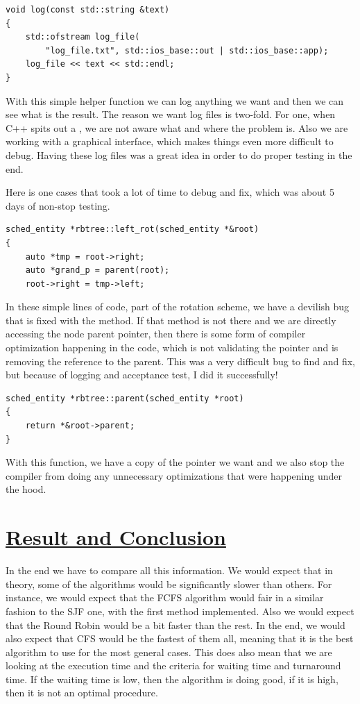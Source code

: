 \documentclass{article}
\newcommand{\code}[1]{\codeinline{\texttt{#1}}}
\begin{document}
\begin{lstlisting}
void log(const std::string &text)
{
    std::ofstream log_file(
        "log_file.txt", std::ios_base::out | std::ios_base::app);
    log_file << text << std::endl;
}
\end{lstlisting}

With this simple helper function we can log anything we want and then we can see what is the result. The reason we want log files is two-fold. For one, when C++ spits out a \code{segfault}, we are not aware what and where the problem is. Also we are working with a graphical interface, which makes things even more difficult to debug. Having these log files was a great idea in order to do proper testing in the end.

Here is one cases that took a lot of time to debug and fix, which was about 5 days of non-stop testing.

\begin{lstlisting}
sched_entity *rbtree::left_rot(sched_entity *&root)
{
    auto *tmp = root->right;
    auto *grand_p = parent(root);
    root->right = tmp->left;
\end{lstlisting}

In these simple lines of code, part of the rotation scheme, we have a devilish bug that is fixed with the \code{parent(node)} method. If that method is not there and we are directly accessing the node parent pointer, then there is some form of compiler optimization happening in the code, which is not validating the pointer and is removing the reference to the parent. This was a very difficult bug to find and fix, but because of logging and acceptance test, I did it successfully!

\begin{lstlisting}
sched_entity *rbtree::parent(sched_entity *root)
{
    return *&root->parent;
}
\end{lstlisting}

With this function, we have a copy of the pointer we want and we also stop the compiler from doing any unnecessary optimizations that were happening under the hood.

\section{\underline{Result and Conclusion}}

In the end we have to compare all this information. We would expect that in theory, some of the algorithms would be significantly slower than others. For instance, we would expect that the FCFS algorithm would fair in a similar fashion to the SJF one, with the first method implemented. Also we would expect that the Round Robin would be a bit faster than the rest. In the end, we would also expect that CFS would be the fastest of them all, meaning that it is the best algorithm to use for the most general cases. This does also mean that we are looking at the execution time and the criteria for waiting time and turnaround time. If the waiting time is low, then the algorithm is doing good, if it is high, then it is not an optimal procedure.
\end{document}
